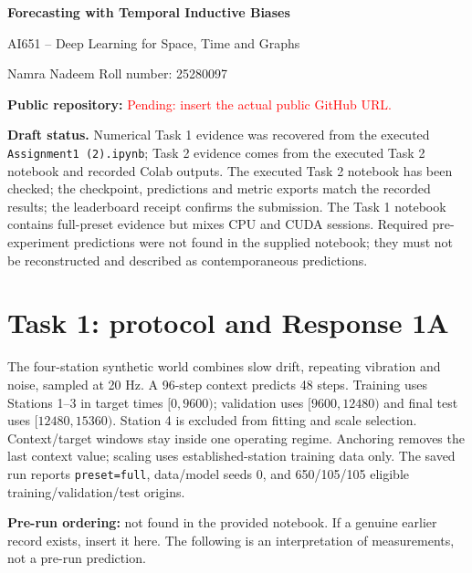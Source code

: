 \documentclass[10pt,a4paper]{article}
\begin{document}
{\LARGE\bfseries\color{navy} Forecasting with Temporal Inductive Biases}\par
{\large AI651 -- Deep Learning for Space, Time and Graphs}\par
Namra Nadeem \quad Roll number: 25280097

\textbf{Public repository:} \textcolor{red}{Pending: insert the actual public GitHub URL.}

\textbf{Draft status.} Numerical Task 1 evidence was recovered from the executed \texttt{Assignment1 (2).ipynb}; Task 2 evidence comes from the executed Task 2 notebook and recorded Colab outputs. The executed Task 2 notebook has been checked; the checkpoint, predictions and metric exports match the recorded results; the leaderboard receipt confirms the submission. The Task 1 notebook contains full-preset evidence but mixes CPU and CUDA sessions. Required pre-experiment predictions were not found in the supplied notebook; they must not be reconstructed and described as contemporaneous predictions.

\section*{Task 1: protocol and Response 1A}
The four-station synthetic world combines slow drift, repeating vibration and noise, sampled at 20 Hz. A 96-step context predicts 48 steps. Training uses Stations 1--3 in target times $[0,9600)$; validation uses $[9600,12480)$ and final test uses $[12480,15360)$. Station 4 is excluded from fitting and scale selection. Context/target windows stay inside one operating regime. Anchoring removes the last context value; scaling uses established-station training data only. The saved run reports \texttt{preset=full}, data/model seeds 0, and 650/105/105 eligible training/validation/test origins.

\textbf{Pre-run ordering:} not found in the provided notebook. If a genuine earlier record exists, insert it here. The following is an interpretation of measurements, not a pre-run prediction.
\end{document}
